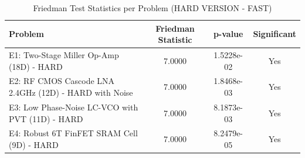 \begin{table}[htbp]
\centering
\caption{Friedman Test Statistics per Problem (HARD VERSION - FAST)}
\label{tab:friedman_stats}
\small
\begin{tabular}{lccc}
\toprule
\textbf{Problem} & \textbf{Friedman Statistic} & \textbf{p-value} & \textbf{Significant} \\
\midrule
E1: Two-Stage Miller Op-Amp (18D) - HARD & 7.0000 & 1.5228e-02 & Yes \\
E2: RF CMOS Cascode LNA 2.4GHz (12D) - HARD with Noise & 7.0000 & 1.8468e-03 & Yes \\
E3: Low Phase-Noise LC-VCO with PVT (11D) - HARD & 7.0000 & 8.1873e-03 & Yes \\
E4: Robust 6T FinFET SRAM Cell (9D) - HARD & 7.0000 & 8.2479e-05 & Yes \\
\bottomrule
\end{tabular}
\end{table}
